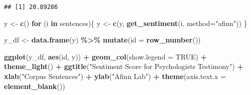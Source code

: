 \documentclass[]{article}
\newenvironment{Shaded}{\begin{snugshade}}{\end{snugshade}}
\newcommand{\ControlFlowTok}[1]{\textcolor[rgb]{0.13,0.29,0.53}{\textbf{#1}}}
\newcommand{\DataTypeTok}[1]{\textcolor[rgb]{0.13,0.29,0.53}{#1}}
\newcommand{\DecValTok}[1]{\textcolor[rgb]{0.00,0.00,0.81}{#1}}
\newcommand{\KeywordTok}[1]{\textcolor[rgb]{0.13,0.29,0.53}{\textbf{#1}}}
\newcommand{\NormalTok}[1]{#1}
\newcommand{\OperatorTok}[1]{\textcolor[rgb]{0.81,0.36,0.00}{\textbf{#1}}}
\newcommand{\OtherTok}[1]{\textcolor[rgb]{0.56,0.35,0.01}{#1}}
\newcommand{\StringTok}[1]{\textcolor[rgb]{0.31,0.60,0.02}{#1}}
\begin{document}
\hypertarget{htmlwidget-5dd7761d0c99ccc42201}{}

\begin{Shaded}
\end{Shaded}

\begin{verbatim}
## [1] 20.89286
\end{verbatim}

\begin{Shaded}
\begin{Highlighting}[]
\NormalTok{y \textless{}{-}}\StringTok{ }\KeywordTok{c}\NormalTok{()}
\ControlFlowTok{for}\NormalTok{ (i }\ControlFlowTok{in}\NormalTok{ sentences)\{}
\NormalTok{  y \textless{}{-}}\StringTok{ }\KeywordTok{c}\NormalTok{(y, }\KeywordTok{get\_sentiment}\NormalTok{(i, }\DataTypeTok{method=}\StringTok{"afinn"}\NormalTok{))}
\NormalTok{\}}

\NormalTok{y\_df \textless{}{-}}\StringTok{ }\KeywordTok{data.frame}\NormalTok{(y) }\OperatorTok{\%\textgreater{}\%}\StringTok{ }
\StringTok{  }\KeywordTok{mutate}\NormalTok{(}\DataTypeTok{id =} \KeywordTok{row\_number}\NormalTok{())}

\KeywordTok{ggplot}\NormalTok{(y\_df, }\KeywordTok{aes}\NormalTok{(id, y)) }\OperatorTok{+}
\StringTok{  }\KeywordTok{geom\_col}\NormalTok{(}\DataTypeTok{show.legend =} \OtherTok{TRUE}\NormalTok{) }\OperatorTok{+}
\StringTok{  }\KeywordTok{theme\_light}\NormalTok{() }\OperatorTok{+}\StringTok{ }
\StringTok{  }\KeywordTok{ggtitle}\NormalTok{(}\StringTok{"Sentiment Score for Psychologist\textquotesingle{}s Testimony"}\NormalTok{) }\OperatorTok{+}\StringTok{  }
\StringTok{  }\KeywordTok{xlab}\NormalTok{(}\StringTok{"Corpus Sentences"}\NormalTok{) }\OperatorTok{+}\StringTok{ }
\StringTok{  }\KeywordTok{ylab}\NormalTok{(}\StringTok{"Afinn Lab"}\NormalTok{) }\OperatorTok{+}\StringTok{ }
\StringTok{  }\KeywordTok{theme}\NormalTok{(}\DataTypeTok{axis.text.x =} \KeywordTok{element\_blank}\NormalTok{()) }
\end{Highlighting}
\end{Shaded}
\end{document}
